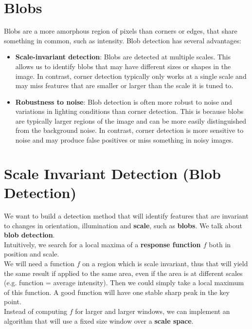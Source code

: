\documentclass{article}
\begin{document}
\newpage

\section*{Blobs}

Blobs are a more amorphous region of pixels than corners or edges, that share something in common, such as intensity. Blob detection has several advantages:

\begin{itemize}
    \item \textbf{Scale-invariant detection}: Blobs are detected at multiple scales. This allows us to identify blobs that may have different sizes or shapes in the image. In contrast, corner detection typically only works at a single scale and may miss features that are smaller or larger than the scale it is tuned to.
    \item \textbf{Robustness to noise}: Blob detection is often more robust to noise and variations in lighting conditions than corner detection. This is because blobs are typically larger regions of the image and can be more easily distinguished from the background noise. In contrast, corner detection is more sensitive to noise and may produce false positives or miss something in noisy images.
\end{itemize}


\section*{Scale Invariant Detection (Blob Detection)}

We want to build a detection method that will identify features that are invariant to changes in orientation, illumination and \textbf{scale}, such as \textbf{blobs}. We talk about \textbf{blob detection}. \\ 

Intuitively, we search for a local maxima of a \textbf{response function $f$} both in position and scale. \\

We will need a function $f$ on a region which is scale invariant, thus that will yield the same result if applied to the same area, even if the area is at different scales (e.g. function = average intensity). Then we could simply take a local maximum of this function. A good function will have one stable sharp peak in the key point. \\

Instead of computing $f$ for larger and larger windows, we can implement an algorithm that will use a fixed size window over a \textbf{scale space}. \\
\end{document}
